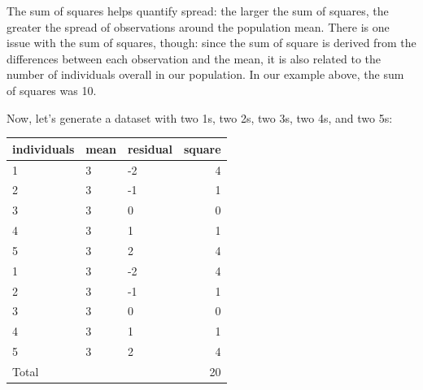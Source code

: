 \documentclass[
]{book}
\newenvironment{Shaded}{\begin{snugshade}}{\end{snugshade}}
\newcommand{\AttributeTok}[1]{\textcolor[rgb]{0.77,0.63,0.00}{#1}}
\newcommand{\DecValTok}[1]{\textcolor[rgb]{0.00,0.00,0.81}{#1}}
\newcommand{\FunctionTok}[1]{\textcolor[rgb]{0.00,0.00,0.00}{#1}}
\newcommand{\NormalTok}[1]{#1}
\newcommand{\OtherTok}[1]{\textcolor[rgb]{0.56,0.35,0.01}{#1}}
\newcommand{\SpecialCharTok}[1]{\textcolor[rgb]{0.00,0.00,0.00}{#1}}
\newcommand{\StringTok}[1]{\textcolor[rgb]{0.31,0.60,0.02}{#1}}
\begin{document}
The sum of squares helps quantify spread: the larger the sum of squares,
the greater the spread of observations around the population mean. There
is one issue with the sum of squares, though: since the sum of square is
derived from the differences between each observation and the mean, it
is also related to the number of individuals overall in our population.
In our example above, the sum of squares was 10.

Now, let's generate a dataset with two 1s, two 2s, two 3s, two 4s, and
two 5s:

\begin{Shaded}
\end{Shaded}

\begin{tabular}[t]{l|l|l|r}
\hline
individuals & mean & residual & square\\
\hline
1 & 3 & -2 & 4\\
\hline
2 & 3 & -1 & 1\\
\hline
3 & 3 & 0 & 0\\
\hline
4 & 3 & 1 & 1\\
\hline
5 & 3 & 2 & 4\\
\hline
1 & 3 & -2 & 4\\
\hline
2 & 3 & -1 & 1\\
\hline
3 & 3 & 0 & 0\\
\hline
4 & 3 & 1 & 1\\
\hline
5 & 3 & 2 & 4\\
\hline
Total &  &  & 20\\
\hline
\end{tabular}
\end{document}
